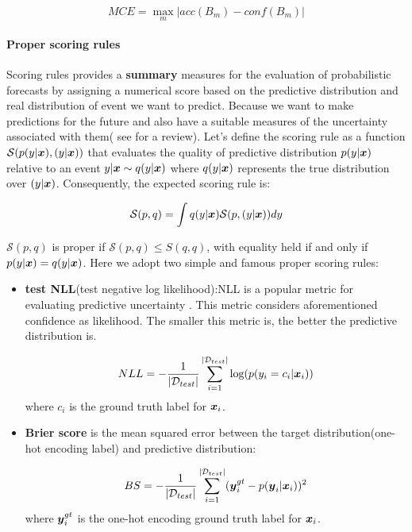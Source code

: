 \begin{equation}
MCE = \max_m|acc(B_m) - conf(B_m)|
\end{equation}


\paragraph{Proper scoring rules} 
Scoring rules provides a \textbf{summary} measures for the evaluation of probabilistic forecasts by assigning a numerical score based on the predictive distribution and real distribution of event we want to predict. Because we want to make predictions for the future and also have a suitable measures of the uncertainty associated with them(  see \cite{gneiting2007strictly} for a review). Let's define the scoring rule as a function $\mathcal S(p(y|\boldsymbol x), (y|\boldsymbol x))$ that evaluates the quality of predictive distribution $p(y|\boldsymbol x)$ relative to an event $y|\boldsymbol x \sim q(y|\boldsymbol x)$ where $q(y|\boldsymbol x)$ represents the true distribution over $(y|\boldsymbol x)$. Consequently, the expected scoring rule is:

\begin{equation}\label{scoring rule}
	\mathcal S(p, q) = \int q(y| \boldsymbol x) \mathcal S(p,(y|\boldsymbol x))dy
\end{equation}

$\mathcal S(p,q)$ is proper if $\mathcal S(p,q) \leq S(q,q)$, with equality held if and only if $p(y|\boldsymbol x) = q(y|\boldsymbol x)$. Here we adopt two simple and famous proper scoring rules:
\begin{itemize}
	\item \textbf{test NLL}(test negative log likelihood):NLL is a popular metric for evaluating predictive uncertainty	\cite{quinonero2005evaluating}. This metric considers aforementioned confidence as likelihood. The smaller this metric is, the better the predictive distribution is.
	
	\begin{equation} \label{nll}
		NLL = -\frac{1}{|\mathcal D_{test}|}\sum_{i=1}^{|\mathcal D_{test}|}\text{log}(p(y_i = c_i|\boldsymbol x_i))
	\end{equation}
	where $c_i$ is the ground truth label for $\boldsymbol x_i$.	
	\item \textbf{Brier score} is the mean squared error between the target distribution(one-hot encoding label) and predictive distribution:
	
	\begin{equation} \label{bs}
	BS = -\frac{1}{|\mathcal D_{test}|}\sum_{i=1}^{|\mathcal D_{test}|}(\boldsymbol y^{gt}_i - p(\boldsymbol y_i|\boldsymbol x_i))^2
	\end{equation}
	where $\boldsymbol y^{gt}_i$ is the one-hot encoding ground truth label for $\boldsymbol x_i$. 
	
\end{itemize}

